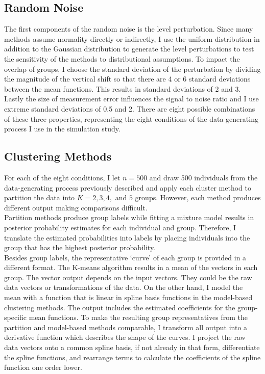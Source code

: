 \subsection{Random Noise}
The first components of the random noise is the level perturbation. Since many methods assume normality directly or indirectly, I use the uniform distribution in addition to the Gaussian distribution to generate the level perturbations to test the sensitivity of the methods to distributional assumptions. To impact the overlap of groups, I choose the standard deviation of the perturbation by dividing the magnitude of the vertical shift so that there are 4 or 6 standard deviations between the mean functions. This results in standard deviations of 2 and 3. Lastly the size of measurement error influences the signal to noise ratio and I use extreme standard deviations of 0.5 and 2. There are eight possible combinations of these three properties, representing the eight conditions of the data-generating process I use in the simulation study. 
\subsection{Clustering Methods}
For each of the eight conditions, I let $n=500$ and draw 500 individuals from the data-generating process previously described and apply each cluster method to partition the data into $K=2,3,4,$ and $5$ groups. However, each method produces different output making comparisons difficult. \\

Partition methods produce group labels while fitting a mixture model results in posterior probability estimates for each individual and group. Therefore, I translate the estimated probabilities into labels by placing individuals into the group that has the highest posterior probability.\\

Besides group labels, the representative `curve' of each group is provided in a different format. The K-means algorithm results in a mean of the vectors in each group. The vector output depends on the input vectors. They could be the raw data vectors or transformations of the data. On the other hand, I model the mean with a function that is linear in spline basis functions in the model-based clustering methods. The output includes the estimated coefficients for the group-specific mean functions. To make the resulting group representatives from the partition and model-based methods comparable, I transform all output into a derivative function which describes the shape of the curves. I project the raw data vectors onto a common spline basis, if not already in that form, differentiate the spline functions, and rearrange terms to calculate the coefficients of the spline function one order lower. \\

